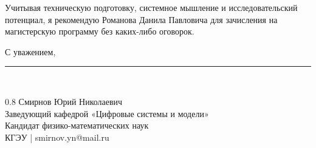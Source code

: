 \documentclass[a4paper,12pt]{article}
\begin{document}
Учитывая техническую подготовку, системное мышление и исследовательский потенциал, я рекомендую Романова Данила Павловича для зачисления на магистерскую программу без каких-либо оговорок.

\vspace{10pt}
\noindent С уважением,

\vspace{15pt}
\rule{5cm}{0.4pt}\\[4pt]
\begin{spacing}{0.8}
  {Смирнов Юрий Николаевич}\\
  {\small Заведующий кафедрой «Цифровые системы и модели»}\\
  {\small Кандидат физико-математических наук}\\
  {\small КГЭУ | smirnov.yn@mail.ru}
\end{spacing}
\end{document}
